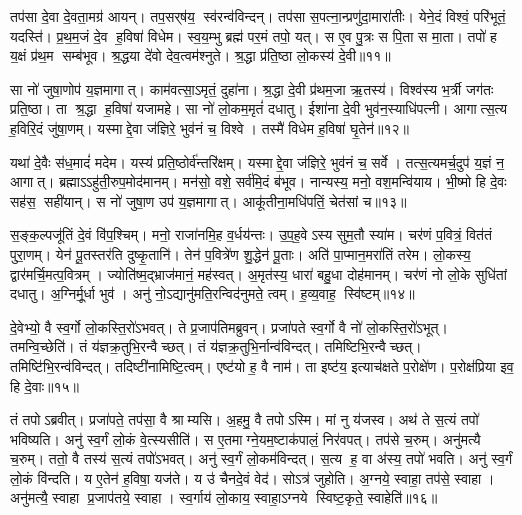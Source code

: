    तप॑सा दे॒वा दे॒वता॒मग्र॑ आयन्।
   तप॒सर्‌ष॑य॒ स्व॑रन्व॑विन्दन्।
   तप॑सा स॒पत्ना॒न्प्रणु॑दा॒मारा॑तीः।
   येने॒दं विश्वं॒ परि॑भूतं॒ यदस्ति॑।
   प्र॒थ॒म॒जं दे॒व ह॒विषा॑ विधेम।
   स्व॒य॒म्भु ब्रह्म॑ पर॒मं तपो॒ यत्।
   स ए॒व पु॒त्रः स पि॒ता स मा॒ता।
   तपो॑ ह य॒क्षं प्र॑थ॒म सम्ब॑भूव।
   श्र॒द्धया दे॑वो देव॒त्वम॑श्नुते।
   श्र॒द्धा प्र॑ति॒ष्ठा लो॒कस्य॑ दे॒वी॥११॥

   सा नो॑ जुषा॒णोप॑ य॒ज्ञमागात्।
   काम॑वत्सा॒ऽमृतं॒ दुहा॑ना।
   श्र॒द्धा दे॒वी प्र॑थम॒जा ऋ॒तस्य॑।
   विश्व॑स्य भ॒र्त्री जग॑तः प्रति॒ष्ठा।
   ता श्र॒द्धा ह॒विषा॑ यजामहे।
   सा नो॑ लो॒कम॒मृतं॑ दधातु।
   ईशा॑ना दे॒वी भुव॑न॒स्याधि॑पत्नी।
   आगात्स॒त्य ह॒विरि॒दं जु॑षा॒णम्।
   यस्माद्दे॒वा ज॑ज्ञिरे॒ भुव॑नं च॒ विश्वे।
   तस्मै॑ विधेम ह॒विषा॑ घृ॒तेन॑॥१२॥

   यथा॑ दे॒वैः स॑ध॒मादं॑ मदेम।
   यस्य॑ प्रति॒ष्ठोर्व॑न्तरि॑क्षम्।
   यस्माद्दे॒वा ज॑ज्ञिरे॒ भुव॑नं च॒ सर्वे।
   तत्स॒त्यमर्च॒दुप॑ य॒ज्ञं न॒ आगात्।
   ब्रह्माऽऽहु॑ती॒रुप॒मोद॑मानम्।
   मन॑सो॒ वशे॒ सर्व॑मि॒दं ब॑भूव।
   नान्यस्य॒ मनो॒ वश॒मन्वि॑याय।
   भी॒ष्मो हि दे॒वः सह॑स॒ सही॑यान्।
   स नो॑ जुषा॒ण उप॑ य॒ज्ञमागात्।
   आकू॑तीना॒मधि॑पतिं॒ चेत॑सां च॥१३॥

   स॒ङ्क॒ल्पजू॑तिं दे॒वं वि॑प॒श्चिम्।
   मनो॒ राजा॑नमि॒ह व॒र्धय॑न्तः।
   उ॒प॒ह॒वेऽस्य सुम॒तौ स्या॑म।
   चर॑णं प॒वित्रं॒ वित॑तं पुरा॒णम्।
   येन॑ पू॒तस्तर॑ति दुष्कृ॒तानि॑।
   तेन॑ प॒वित्रे॑ण शु॒द्धेन॑ पू॒ताः।
   अति॑ पा॒प्मान॒मरा॑तिं तरेम।
   लो॒कस्य॒ द्वार॑मर्चि॒मत्प॒वित्रम्।
   ज्योति॑ष्म॒द्भ्राज॑मानं॒ मह॑स्वत्।
   अ॒मृत॑स्य॒ धारा॑ बहु॒धा दोह॑मानम्।
   चर॑णं नो लो॒के सुधि॑तां दधातु।
   अ॒ग्निर्मू॒र्धा भुव॑।
   अनु॑ नो॒ऽद्यानु॑मति॒रन्विद॑नुमते॒ त्वम्।
   ह॒व्य॒वाह॒ स्वि॑ष्टम्॥१४॥
\anuvakamend
  
   दे॒वेभ्यो॒ वै स्व॒र्गो लो॒कस्ति॒रो॑ऽभवत्।
   ते प्र॒जाप॑तिमब्रुवन्।
   प्रजा॑पते स्व॒र्गो वै नो॑ लो॒कस्ति॒रो॑ऽभूत्।
   तमन्वि॒च्छेति॑।
   तं य॑ज्ञक्र॒तुभि॒रन्वैच्छत्।
   तं य॑ज्ञक्र॒तुभि॒र्नान्व॑विन्दत्।
   तमिष्टिभि॒\-रन्वैच्छत्।
   तमिष्टि॑भि॒रन्व॑विन्दत्।
   तदिष्टी॑नामिष्टि॒त्वम्।
   एष्ट॑यो ह॒ वै नाम॑।
   ता इष्ट॑य॒ इत्याच॑क्षते प॒रोक्षे॑ण।
   प॒रोक्ष॑प्रिया इव॒ हि दे॒वाः॥१५॥

   तं तपोऽब्रवीत्।
   प्रजा॑पते॒ तप॑सा॒ वै श्राम्यसि।
   अ॒हमु॒ वै तपोऽस्मि।
   मां नु य॑जस्व।
   अथ॑ ते स॒त्यं तपो॑ भविष्यति।
   अनु॑ स्व॒र्गं लो॒कं वे॒त्स्यसीति॑।
   स ए॒तमाग्ने॒यम॒ष्टाक॑पालं॒ निर॑वपत्।
   तप॑से च॒रुम्।
   अनु॑मत्यै च॒रुम्।
   ततो॒ वै तस्य॑ स॒त्यं तपो॑ऽभवत्।
   अनु॑ स्व॒र्गं लो॒कम॑विन्दत्।
   स॒त्य ह॒ वा अ॑स्य॒ तपो॑ भवति।
   अनु॑ स्व॒र्गं लो॒कं वि॑न्दति।
   य ए॒तेन॑ ह॒विषा॒ यज॑ते।
   य उ॑ चैनदे॒वं वेद॑।
   सोऽत्र॑ जुहोति।
   अ॒ग्नये॒ स्वाहा॒ तप॑से॒ स्वाहा।
   अनु॑मत्यै॒ स्वाहा प्र॒जाप॑तये॒ स्वाहा।
   स्व॒र्गाय॑ लो॒काय॒ स्वाहा॒ऽग्नये स्विष्ट॒कृते॒ स्वाहेति॑॥१६॥


